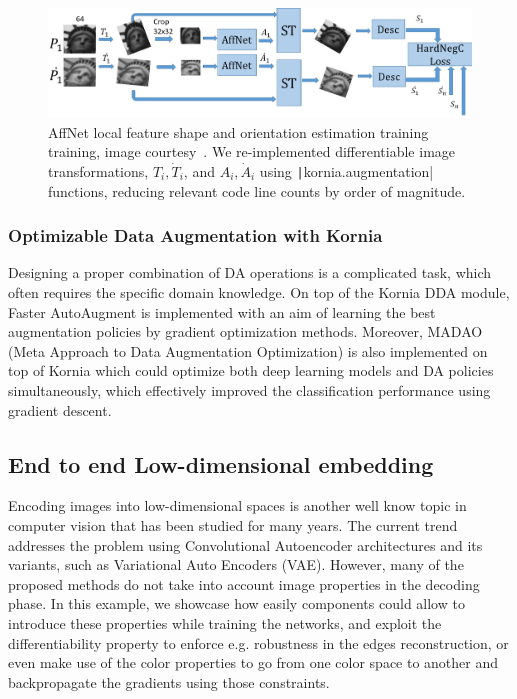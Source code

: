 \begin{figure}[htb]%
\centering
\includegraphics[width=0.95\linewidth]{main/chapter03/data/dda/imgs/affnet_tr_scheme2.PNG}
\caption{AffNet local feature shape and orientation estimation training training, image courtesy~\cite{AffNet2018}. We re-implemented differentiable image transformations, $T_i, \dot{T}_i$, and $A_i, \dot{A}_i$ using \texttt|kornia.augmentation| functions, reducing relevant code line counts by order of magnitude.}
\label{fig:affnet-training-scheme}
\end{figure}

\subsubsection{Optimizable Data Augmentation with Kornia}

Designing a proper combination of DA operations is a complicated task, which often requires the specific domain knowledge. On top of the Kornia DDA module, Faster AutoAugment \cite{hataya2019faster} is implemented with an aim of learning the best augmentation policies by gradient optimization methods. Moreover, MADAO \cite{hataya2019faster} (Meta Approach to Data Augmentation Optimization) is also implemented on top of Kornia which could optimize both deep learning models and DA policies simultaneously, which effectively improved the classification performance using gradient descent.


\subsection{End to end Low-dimensional embedding}
\label{section:use_cases:image_reconstruction}

Encoding images into low-dimensional spaces is another well know topic in computer vision that has been studied for many years. The current trend  addresses the problem using  Convolutional Autoencoder architectures and  its   variants, such as Variational Auto Encoders (VAE). However, many of the proposed methods do not take into account image properties in the decoding phase. In this example, we  showcase how easily \lib{} components could allow to introduce these properties while training the networks, and exploit the differentiability property to enforce e.g. robustness in the edges reconstruction, or even make use of the color properties to go from one color space to another and backpropagate the gradients using those constraints.

